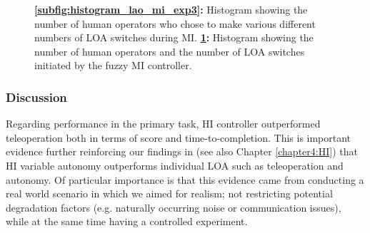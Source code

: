 \documentclass[a4paper,12pt,oneside,openright]{bhamthesis}
\begin{document}
\begin{figure}
\begin{subfigure}[b]{0.45\textwidth}
			\caption{}
			\label{subfig:histogram_lao_mi_ai_exp3}
		\end{subfigure}
		\hfill
		\caption{\textbf{\ref{subfig:histogram_lao_mi_exp3}:} Histogram showing the number of human operators who chose to make various different numbers of LOA switches during MI. \textbf{\ref{subfig:histogram_lao_mi_ai_exp3}:} Histogram showing the number of human operators and the number of LOA switches initiated by the fuzzy MI controller.}
		\label{fig:histograms_mi_exp3}
	\end{figure}


\subsubsection{Discussion}
Regarding performance in the primary task, HI controller outperformed teleoperation both in terms of score and time-to-completion. This is important evidence further reinforcing our findings in \cite{Chiou2016} (see also Chapter \ref{chapter4:HI}) that HI variable autonomy outperforms individual LOA such as teleoperation and autonomy. Of particular importance is that this evidence came from conducting a real world scenario in which we aimed for realism; not restricting potential degradation factors (e.g. naturally occurring noise or communication issues), while at the same time having a controlled experiment. 
\end{document}
